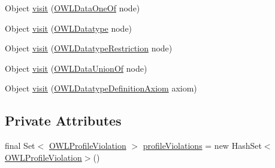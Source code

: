 \begin{DoxyCompactItemize}
\item 
Object \hyperlink{classorg_1_1semanticweb_1_1owlapi_1_1profiles_1_1_o_w_l2_r_l_profile_1_1_o_w_l2_r_l_object_visitor_a8dd6d74675754beae0f3e2868fb5db7e}{visit} (\hyperlink{interfaceorg_1_1semanticweb_1_1owlapi_1_1model_1_1_o_w_l_data_one_of}{O\-W\-L\-Data\-One\-Of} node)
\item 
Object \hyperlink{classorg_1_1semanticweb_1_1owlapi_1_1profiles_1_1_o_w_l2_r_l_profile_1_1_o_w_l2_r_l_object_visitor_a9a9fbb019ebc401506f639a1249e5194}{visit} (\hyperlink{interfaceorg_1_1semanticweb_1_1owlapi_1_1model_1_1_o_w_l_datatype}{O\-W\-L\-Datatype} node)
\item 
Object \hyperlink{classorg_1_1semanticweb_1_1owlapi_1_1profiles_1_1_o_w_l2_r_l_profile_1_1_o_w_l2_r_l_object_visitor_af72a781e5a328f6491c67e375d227db2}{visit} (\hyperlink{interfaceorg_1_1semanticweb_1_1owlapi_1_1model_1_1_o_w_l_datatype_restriction}{O\-W\-L\-Datatype\-Restriction} node)
\item 
Object \hyperlink{classorg_1_1semanticweb_1_1owlapi_1_1profiles_1_1_o_w_l2_r_l_profile_1_1_o_w_l2_r_l_object_visitor_a252773e9d81e73302e9c98e7cdc47e4e}{visit} (\hyperlink{interfaceorg_1_1semanticweb_1_1owlapi_1_1model_1_1_o_w_l_data_union_of}{O\-W\-L\-Data\-Union\-Of} node)
\item 
Object \hyperlink{classorg_1_1semanticweb_1_1owlapi_1_1profiles_1_1_o_w_l2_r_l_profile_1_1_o_w_l2_r_l_object_visitor_a2836136a72617f0f21a912895e2df3fd}{visit} (\hyperlink{interfaceorg_1_1semanticweb_1_1owlapi_1_1model_1_1_o_w_l_datatype_definition_axiom}{O\-W\-L\-Datatype\-Definition\-Axiom} axiom)
\end{DoxyCompactItemize}
\subsection*{Private Attributes}
\begin{DoxyCompactItemize}
\item 
final Set$<$ \hyperlink{classorg_1_1semanticweb_1_1owlapi_1_1profiles_1_1_o_w_l_profile_violation}{O\-W\-L\-Profile\-Violation} $>$ \hyperlink{classorg_1_1semanticweb_1_1owlapi_1_1profiles_1_1_o_w_l2_r_l_profile_1_1_o_w_l2_r_l_object_visitor_af337593d4c47f15792c11838113d7927}{profile\-Violations} = new Hash\-Set$<$\hyperlink{classorg_1_1semanticweb_1_1owlapi_1_1profiles_1_1_o_w_l_profile_violation}{O\-W\-L\-Profile\-Violation}$>$()
\end{DoxyCompactItemize}


